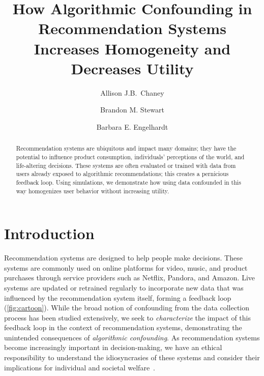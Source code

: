 \documentclass[sigconf]{acmart}
\begin{document}
\title[Algorithmic Confounding in Recommendation Systems Increases Homogeneity]{How Algorithmic Confounding in Recommendation Systems Increases Homogeneity and Decreases Utility}


\author{Allison J.B.~Chaney}

\author{Brandon M. Stewart}

\author{Barbara E. Engelhardt}


\begin{abstract}
Recommendation systems are ubiquitous and impact many domains; they have the potential to influence product consumption, individuals' perceptions of the world, and life-altering decisions.  These systems are often evaluated or trained with data from users already exposed to algorithmic recommendations; this creates a pernicious feedback loop.
Using simulations, we demonstrate how using data confounded in this way homogenizes user behavior without increasing utility.
\end{abstract}


\maketitle

\section{Introduction}
Recommendation systems are designed to help people make decisions.  These systems are commonly used on online platforms for video, music, and product purchases through service providers such as Netflix, Pandora, and Amazon.  Live systems are updated or retrained regularly to incorporate new data that was influenced by the recommendation system itself, forming a feedback loop (\cref{fig:cartoon}).
While the broad notion of confounding from the data collection process has been studied extensively, we seek to \emph{characterize} the impact of this feedback loop in the context of recommendation systems, demonstrating the unintended consequences of \emph{algorithmic confounding}.
As recommendation systems become increasingly important in decision-making, we have an ethical responsibility to understand the idiosyncrasies of these systems and consider their implications for individual and societal welfare~\cite{2018BetterRecs}.
\end{document}
